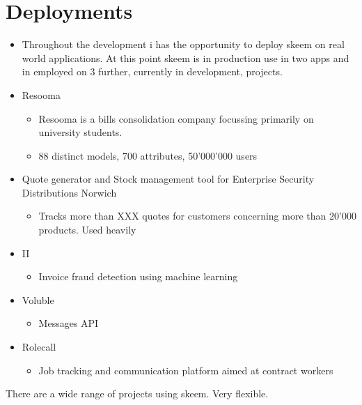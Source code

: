 \documentclass[
  12pt,
]{article}
\providecommand{\tightlist}{%
  \setlength{\itemsep}{0pt}\setlength{\parskip}{0pt}}
\begin{document}
\hypertarget{deployments}{%
\section{Deployments}\label{deployments}}

\begin{itemize}
\tightlist
\item
  Throughout the development i has the opportunity to deploy skeem on
  real world applications. At this point skeem is in production use in
  two apps and in employed on 3 further, currently in development,
  projects.
\item
  Resooma

  \begin{itemize}
  \tightlist
  \item
    Resooma is a bills consolidation company focussing primarily on
    university students.
  \item
    88 distinct models, 700 attributes, 50'000'000 users
  \end{itemize}
\item
  Quote generator and Stock management tool for Enterprise Security
  Distributions Norwich

  \begin{itemize}
  \tightlist
  \item
    Tracks more than XXX quotes for customers concerning more than
    20'000 products. Used heavily
  \end{itemize}
\item
  II

  \begin{itemize}
  \tightlist
  \item
    Invoice fraud detection using machine learning
  \end{itemize}
\item
  Voluble

  \begin{itemize}
  \tightlist
  \item
    Messages API
  \end{itemize}
\item
  Rolecall

  \begin{itemize}
  \tightlist
  \item
    Job tracking and communication platform aimed at contract workers
  \end{itemize}
\end{itemize}

There are a wide range of projects using skeem. Very flexible.
\end{document}
